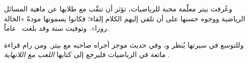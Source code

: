 \documentclass[../../../include/open-logic-section]{subfiles}
\begin{document}
وعُرفت بيتر معلّمة محبة للرياضيات، تؤثر أن تنقّب مع طلابها عن ماهية
المسائل الرياضية ووجوه حسنها على أن تلقي إليهم الكلام إلقاء؛ فكانوا
يسمونها مودةً «الخالة روزا». وتوفيت سنة  وقد بلغت~ عاماً.

\begin{reading}
وللتوسع في سيرتها يُنظر \citep{Oconnor2014} و\citep{Andrasfai1986}، وفي
\citet{Tamassy1994} حديث موجز أجراه صاحبه مع بيتر. ومن رام قراءة ماتعة في
الرياضيات فليرجع إلى كتابها \emph{اللعب مع اللانهاية}
\citep{Peter2010}.
\end{reading}
\end{document}

